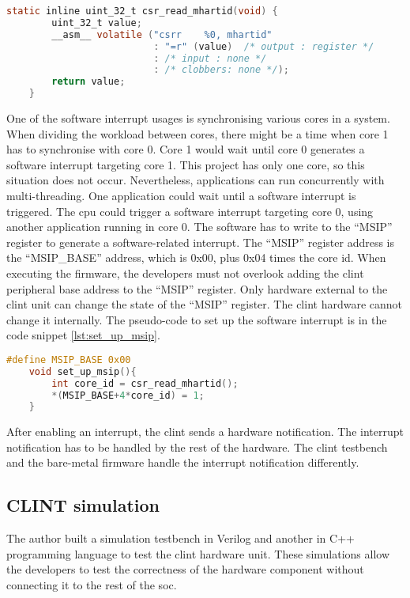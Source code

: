 \begin{lstlisting}[language=C, caption={Read core id from \acrshort{csr}.}, label=lst:read_mhartid]
    static inline uint_32_t csr_read_mhartid(void) {
        uint_32_t value;        
        __asm__ volatile ("csrr    %0, mhartid"
                          : "=r" (value)  /* output : register */
                          : /* input : none */
                          : /* clobbers: none */);
        return value;
    }
\end{lstlisting}

One of the software interrupt usages is synchronising various cores in a system. When dividing the workload between cores, there might be a time when core 1 has to synchronise with core 0. Core 1 would wait until core 0 generates a software interrupt targeting core 1. This project has only one core, so this situation does not occur. Nevertheless, applications can run concurrently with multi-threading. One application could wait until a software interrupt is triggered. The \acrshort{cpu} could trigger a software interrupt targeting core 0, using another application running in core 0. The software has to write to the \enquote{MSIP} register to generate a software-related interrupt. The \enquote{MSIP} register address is the \enquote{MSIP\_BASE} address, which is 0x00, plus 0x04 times the core id. When executing the firmware, the developers must not overlook adding the \acrshort{clint} peripheral base address to the \enquote{MSIP} register. Only hardware external to the \acrshort{clint} unit can change the state of the \enquote{MSIP} register. The \acrshort{clint} hardware cannot change it internally. The pseudo-code to set up the software interrupt is in the code snippet \ref*{lst:set_up_msip}.

\begin{lstlisting}[language=C, caption={Set Up Software Interrupt.}, label=lst:set_up_msip]
    #define MSIP_BASE 0x00
    void set_up_msip(){
        int core_id = csr_read_mhartid();
        *(MSIP_BASE+4*core_id) = 1;
    }
\end{lstlisting}

After enabling an interrupt, the \acrshort{clint} sends a hardware notification. The interrupt notification has to be handled by the rest of the hardware. The \acrshort{clint} testbench and the bare-metal firmware handle the interrupt notification differently.

\subsection{CLINT simulation}
\label{subsection:clint_simulation}
The author built a simulation testbench in Verilog and another in C++ programming language to test the \acrshort{clint} hardware unit. These simulations allow the developers to test the correctness of the hardware component without connecting it to the rest of the \acrshort{soc}.

